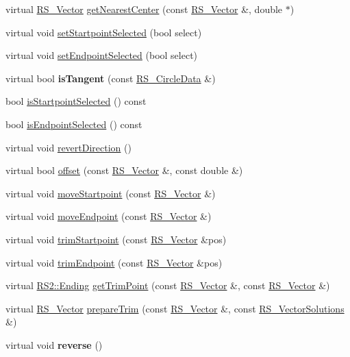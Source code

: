 \begin{DoxyCompactItemize}
\item 
virtual \hyperlink{classRS__Vector}{R\-S\-\_\-\-Vector} \hyperlink{classRS__AtomicEntity_ad3423fcd97d10a149d3f2e4b2a242302}{get\-Nearest\-Center} (const \hyperlink{classRS__Vector}{R\-S\-\_\-\-Vector} \&, double $\ast$)
\item 
virtual void \hyperlink{classRS__AtomicEntity_a3de4b75e6f1eb4bf419c3535db682654}{set\-Startpoint\-Selected} (bool select)
\item 
virtual void \hyperlink{classRS__AtomicEntity_aca8cf2ec2643782c68cc9700417fec31}{set\-Endpoint\-Selected} (bool select)
\item 
\hypertarget{classRS__AtomicEntity_a6e3e1abe7023466dcb6bf02dc2a696de}{virtual bool {\bfseries is\-Tangent} (const \hyperlink{classRS__CircleData}{R\-S\-\_\-\-Circle\-Data} \&)}\label{classRS__AtomicEntity_a6e3e1abe7023466dcb6bf02dc2a696de}

\item 
bool \hyperlink{classRS__AtomicEntity_a473df8be63625c778525c1f368adbeb0}{is\-Startpoint\-Selected} () const 
\item 
bool \hyperlink{classRS__AtomicEntity_a444007e91f942f6ae174744b67294b01}{is\-Endpoint\-Selected} () const 
\item 
virtual void \hyperlink{classRS__AtomicEntity_afe0370ebde92e7417e4adac09d9a1d52}{revert\-Direction} ()
\item 
virtual bool \hyperlink{classRS__AtomicEntity_ab708a0d05c11fd7eff646243db60464a}{offset} (const \hyperlink{classRS__Vector}{R\-S\-\_\-\-Vector} \&, const double \&)
\item 
virtual void \hyperlink{classRS__AtomicEntity_ae09eb376e84a70a3bcf2367ed9397cca}{move\-Startpoint} (const \hyperlink{classRS__Vector}{R\-S\-\_\-\-Vector} \&)
\item 
virtual void \hyperlink{classRS__AtomicEntity_a7e35f48ae53da907f698e0e73887a1ca}{move\-Endpoint} (const \hyperlink{classRS__Vector}{R\-S\-\_\-\-Vector} \&)
\item 
virtual void \hyperlink{classRS__AtomicEntity_a33af8cca51e643cffbac55f3dbf9f670}{trim\-Startpoint} (const \hyperlink{classRS__Vector}{R\-S\-\_\-\-Vector} \&pos)
\item 
virtual void \hyperlink{classRS__AtomicEntity_a021db5f1757de41b2fe385d22bf2aaea}{trim\-Endpoint} (const \hyperlink{classRS__Vector}{R\-S\-\_\-\-Vector} \&pos)
\item 
virtual \hyperlink{classRS2_a30e80df2ef4bb36f4e89ea500eb212ab}{R\-S2\-::\-Ending} \hyperlink{classRS__AtomicEntity_a7bb9189a26b1cd6e17d6b6283190d05c}{get\-Trim\-Point} (const \hyperlink{classRS__Vector}{R\-S\-\_\-\-Vector} \&, const \hyperlink{classRS__Vector}{R\-S\-\_\-\-Vector} \&)
\item 
virtual \hyperlink{classRS__Vector}{R\-S\-\_\-\-Vector} \hyperlink{classRS__AtomicEntity_a18a73c3316ee38b6798d41d18fb6c093}{prepare\-Trim} (const \hyperlink{classRS__Vector}{R\-S\-\_\-\-Vector} \&, const \hyperlink{classRS__VectorSolutions}{R\-S\-\_\-\-Vector\-Solutions} \&)
\item 
\hypertarget{classRS__AtomicEntity_a70264ad0d8a6ffac2af46e6be94e8f69}{virtual void {\bfseries reverse} ()}\label{classRS__AtomicEntity_a70264ad0d8a6ffac2af46e6be94e8f69}


\end{DoxyCompactItemize}
